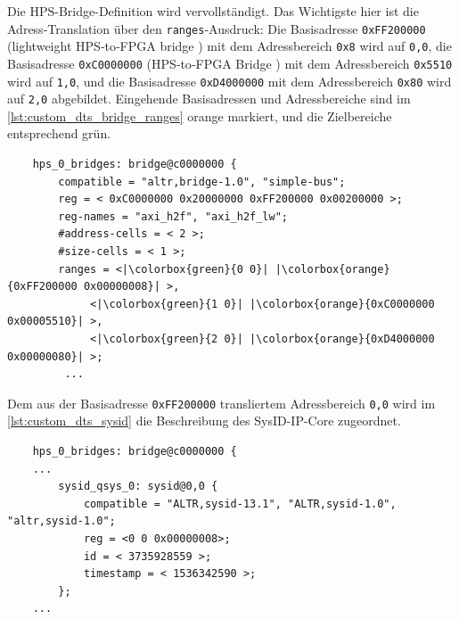 Die HPS-Bridge-Definition wird vervollständigt. Das Wichtigste hier ist die Adress-Translation über den \texttt{ranges}-Ausdruck: Die Basisadresse \texttt{0xFF200000} (lightweight HPS‐to‐FPGA bridge \cite[21]{article:embedded_systems}) mit dem Adressbereich \texttt{0x8} wird auf \texttt{0,0}, die Basisadresse \texttt{0xC0000000} (HPS‐to‐FPGA Bridge \cite[22]{article:embedded_systems}) mit dem Adressbereich \texttt{0x5510} wird auf \texttt{1,0}, und die Basisadresse \texttt{0xD4000000} mit dem Adressbereich \texttt{0x80} wird auf \texttt{2,0} abgebildet. Eingehende Basisadressen und Adressbereiche sind im \cref{lst:custom_dts_bridge_ranges} orange markiert, und die Zielbereiche entsprechend grün.

\begin{code}
	\begin{verbatim}
	hps_0_bridges: bridge@c0000000 {
		compatible = "altr,bridge-1.0", "simple-bus";
		reg = < 0xC0000000 0x20000000 0xFF200000 0x00200000 >;
		reg-names = "axi_h2f", "axi_h2f_lw";
		#address-cells = < 2 >;
		#size-cells = < 1 >;
		ranges = <|\colorbox{green}{0 0}| |\colorbox{orange}{0xFF200000 0x00000008}| >,
			 <|\colorbox{green}{1 0}| |\colorbox{orange}{0xC0000000 0x00005510}| >,
			 <|\colorbox{green}{2 0}| |\colorbox{orange}{0xD4000000 0x00000080}| >;
		 ...
	\end{verbatim}
	
	\caption{Devicetree: Adresstranslation in der HPS-Bridge}
	\label{lst:custom_dts_bridge_ranges}
\end{code}

Dem aus der Basisadresse \texttt{0xFF200000} transliertem Adressbereich \texttt{0,0} wird im \cref{lst:custom_dts_sysid} die Beschreibung des SysID-IP-Core zugeordnet. 
\begin{code}
	\begin{verbatim}
	hps_0_bridges: bridge@c0000000 {
	...
		sysid_qsys_0: sysid@0,0 {
			compatible = "ALTR,sysid-13.1", "ALTR,sysid-1.0", "altr,sysid-1.0";
			reg = <0 0 0x00000008>;
			id = < 3735928559 >;
			timestamp = < 1536342590 >;
		}; 
	...
	\end{verbatim}
	
	\caption{Devicetree: SysID-Definition}
	\label{lst:custom_dts_sysid}
\end{code}

